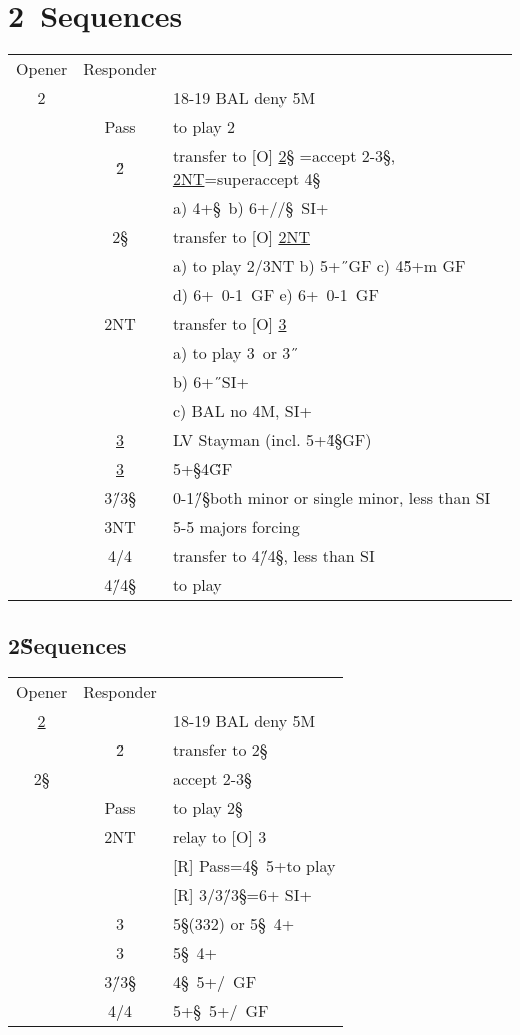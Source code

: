 \newpage


\chapter{2\D\ Sequences}

\hypertarget{2d}{}
\begin{longtable}{C{\bidlength} C{\bidlength} | l}
Opener & Responder \\
2\D  & & 18-19 BAL deny 5M\\
\hline
&Pass& to play 2\D\ \\
&2\H & transfer to [O] \hyperlink{2d2h2s}{2\S} =accept 2-3\S,
                       \hyperlink{2d2h2n}{2NT}=superaccept 4\S\\
&    & a) 4+\S\ b) 6+\C/\D/\S\ SI+ \\
&2\S & transfer to [O] \hyperlink{2d2s2n}{2NT} \\
&    & a) to play 2/3NT b) 5+\H\ GF c) 4\H5+m GF \\
&    & d) 6+\C\ 0-1\D\ GF e) 6+\D\ 0-1\C\ GF \\
&2NT & transfer to [O] \hyperlink{2d2n3c}{3\C} \\
&    & a) to play 3\C\ or 3\H\ \\
&    & b) 6+\H\ SI+ \\
&    & c) BAL no 4M, SI+ \\
&\hyperlink{2d3c}{3\C} & LV Stayman (incl. 5+\H 4\S GF) \\
&\hyperlink{2d3d}{3\D} & 5+\S 4\H GF \\
&3\H/3\S & 0-1\H/\S both minor or single minor, less than SI \\
&3NT & 5-5 majors forcing \\
&4\C/4\D & transfer to 4\H/4\S, less than SI \\
&4\H/4\S & to play \\
\end{longtable}

\section{2\H Sequences}

\hypertarget{2d2h2s}{}
\begin{longtable}{C{\bidlength} C{\bidlength} | l}
Opener & Responder \\
\hyperlink{2d}{2\D} & & 18-19 BAL deny 5M \\
& 2\H & transfer to 2\S \\
2\S & & accept 2-3\S \\
\hline
& Pass& to play 2\S \\
& 2NT & relay to [O] 3\C \\
&     & [R] Pass=4\S\ 5+\C to play \\
&     & [R] 3\D/3\H/3\S=6+ SI+ \\
& 3\C & 5\S(332) or 5\S\ 4+\D \\
& 3\D & 5\S\ 4+\C \\
& 3\H/3\S & 4\S\ 5+\C/\D\ GF \\
& 4\C/4\D & 5+\S\ 5+\C/\D\ GF \\
\end{longtable}


